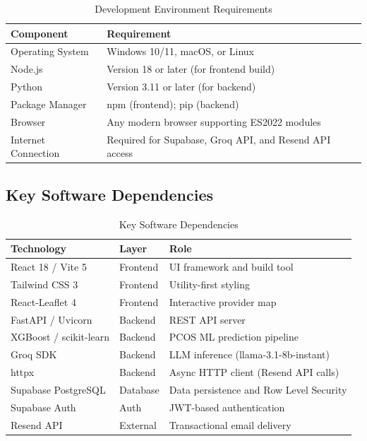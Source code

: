 \begin{table}[h!]
\centering
\caption{Development Environment Requirements}
\label{tab:dev-req}
\renewcommand{\arraystretch}{1.4}
\begin{tabular}{|p{4cm}|p{8.5cm}|}
\hline
\rowcolor[HTML]{D9D9D9}
\textbf{Component} & \textbf{Requirement} \\
\hline
Operating System & Windows 10/11, macOS, or Linux \\
\hline
Node.js & Version 18 or later (for frontend build) \\
\hline
Python & Version 3.11 or later (for backend) \\
\hline
Package Manager & npm (frontend); pip (backend) \\
\hline
Browser & Any modern browser supporting ES2022 modules \\
\hline
Internet Connection & Required for Supabase, Groq API, and Resend API access \\
\hline
\end{tabular}
\end{table}

\subsection{Key Software Dependencies}

\begin{table}[h!]
\centering
\caption{Key Software Dependencies}
\label{tab:sw-deps}
\renewcommand{\arraystretch}{1.4}
\begin{tabular}{|p{3.5cm}|p{3cm}|p{6cm}|}
\hline
\rowcolor[HTML]{D9D9D9}
\textbf{Technology} & \textbf{Layer} & \textbf{Role} \\
\hline
React 18 / Vite 5 & Frontend & UI framework and build tool \\
\hline
Tailwind CSS 3 & Frontend & Utility-first styling \\
\hline
React-Leaflet 4 & Frontend & Interactive provider map \\
\hline
FastAPI / Uvicorn & Backend & REST API server \\
\hline
XGBoost / scikit-learn & Backend & PCOS ML prediction pipeline \\
\hline
Groq SDK & Backend & LLM inference (llama-3.1-8b-instant) \\
\hline
httpx & Backend & Async HTTP client (Resend API calls) \\
\hline
Supabase PostgreSQL & Database & Data persistence and Row Level Security \\
\hline
Supabase Auth & Auth & JWT-based authentication \\
\hline
Resend API & External & Transactional email delivery \\
\hline
\end{tabular}
\end{table}

